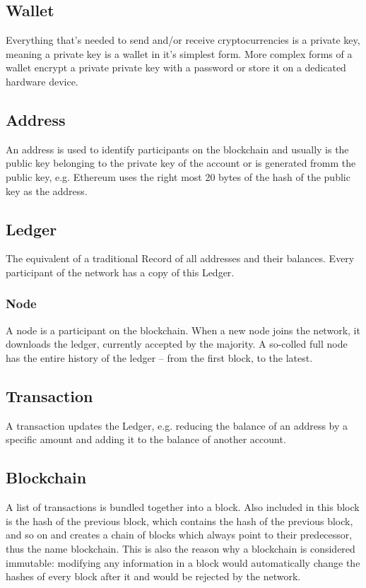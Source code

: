 \subsection{Wallet}
Everything that’s needed to send and/or receive cryptocurrencies is a private key\cite{bitcoin-whitepaper}, meaning a private key is a wallet in it’s simplest form. More complex forms of a wallet encrypt a private private key with a password or store it on a dedicated hardware device.
\\

\subsection{Address}
An address is used to identify participants on the blockchain and usually is the public key belonging to the private key of the account or is generated fromm the public key, e.g. Ethereum  uses the right most 20 bytes of the hash of the public key as the address\cite{ethereum-yellow-paper}.
\\

\subsection{Ledger}
The equivalent of a traditional Record of all addresses and their balances. Every participant of the network has a copy of this Ledger.
\\

\subsubsection{Node}
A node is a participant on the blockchain. When a new node joins the network, it downloads the ledger, currently accepted by the majority. A so-colled full node has the entire history of the ledger – from the first block, to the latest.
\\

\subsection{Transaction}
A transaction updates the Ledger, e.g. reducing the balance of an address by a specific amount and adding it to the balance of another account.
\\

\subsection{Blockchain}
A list of transactions is bundled together into a block. Also included in this block is the hash of the previous block, which contains the hash of the previous block, and so on and creates a chain of blocks\cite{bitcoin-whitepaper} which always point to their predecessor, thus the name blockchain. This is also the reason why a blockchain is considered immutable: modifying any information in a block would automatically change the hashes of every block after it and would be rejected by the network.
\\

